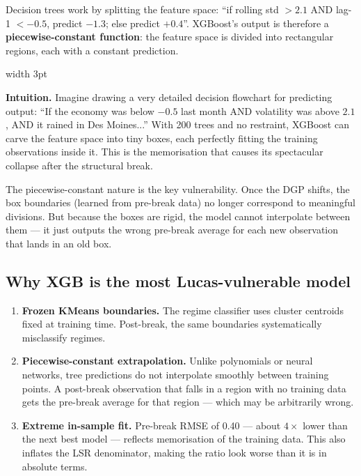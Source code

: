 \documentclass[11pt, a4paper]{article}
\newenvironment{intubox}{%
  \vspace{4pt}\par\noindent%
  {\color{darkblue}\vrule width 3pt}\hspace{6pt}%
  \begin{minipage}{\dimexpr\linewidth-9pt\relax}\vspace{2pt}%
}{%
  \vspace{2pt}\end{minipage}\par\vspace{4pt}%
}
\begin{document}
Decision trees work by splitting the feature space: ``if rolling std $> 2.1$
AND lag-1 $< -0.5$, predict $-1.3$; else predict $+0.4$''. XGBoost's output is
therefore a \textbf{piecewise-constant function}: the feature space is divided
into rectangular regions, each with a constant prediction.

\begin{intubox}
\textbf{Intuition.}
Imagine drawing a very detailed decision flowchart for predicting output:
``If the economy was below $-0.5$ last month AND volatility was above $2.1$,
AND it rained in Des Moines...'' With 200 trees and no restraint, XGBoost can
carve the feature space into tiny boxes, each perfectly fitting the training
observations inside it. This is the memorisation that causes its spectacular
collapse after the structural break.

The piecewise-constant nature is the key vulnerability. Once the DGP shifts,
the box boundaries (learned from pre-break data) no longer correspond to
meaningful divisions. But because the boxes are rigid, the model cannot
interpolate between them --- it just outputs the wrong pre-break average for
each new observation that lands in an old box.
\end{intubox}

\subsection{Why XGB is the most Lucas-vulnerable model}

\begin{enumerate}[leftmargin=*, itemsep=3pt]
  \item \textbf{Frozen KMeans boundaries.} The regime classifier uses cluster
        centroids fixed at training time. Post-break, the same boundaries
        systematically misclassify regimes.
  \item \textbf{Piecewise-constant extrapolation.} Unlike polynomials or neural
        networks, tree predictions do not interpolate smoothly between training
        points. A post-break observation that falls in a region with no training
        data gets the pre-break average for that region --- which may be
        arbitrarily wrong.
  \item \textbf{Extreme in-sample fit.} Pre-break RMSE of 0.40 --- about $4\times$
        lower than the next best model --- reflects memorisation of the training
        data. This also inflates the LSR denominator, making the ratio look worse
        than it is in absolute terms.
\end{enumerate}
\end{document}
